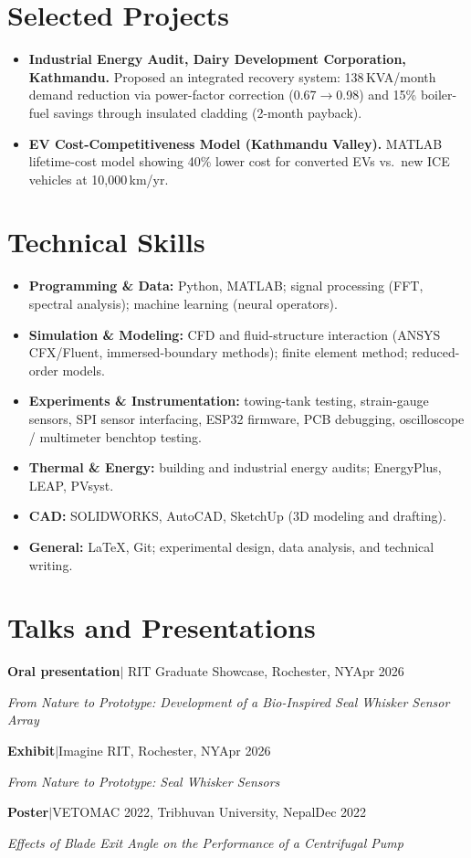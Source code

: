 \documentclass[10pt,letterpaper]{article}
\newcommand{\talk}[4]{\textbf{#1}\enspace$|$\enspace #2\hfill #3\par\nopagebreak\hspace*{1.2em}\textit{#4}\par\vspace{3pt}}
\begin{document}
\section*{Selected Projects}
\begin{itemize}
  \item \textbf{Industrial Energy Audit, Dairy Development Corporation, Kathmandu.} Proposed an integrated recovery system: 138\,KVA/month demand reduction via power-factor correction (0.67$\rightarrow$0.98) and 15\% boiler-fuel savings through insulated cladding (2-month payback).
  \item \textbf{EV Cost-Competitiveness Model (Kathmandu Valley).} MATLAB lifetime-cost model showing 40\% lower cost for converted EVs vs.\ new ICE vehicles at 10{,}000\,km/yr.
\end{itemize}

\section*{Technical Skills}
\begin{itemize}
  \item \textbf{Programming \& Data:} Python, MATLAB; signal processing (FFT, spectral analysis); machine learning (neural operators).
  \item \textbf{Simulation \& Modeling:} CFD and fluid-structure interaction (ANSYS CFX/Fluent, immersed-boundary methods); finite element method; reduced-order models.
  \item \textbf{Experiments \& Instrumentation:} towing-tank testing, strain-gauge sensors, SPI sensor interfacing, ESP32 firmware, PCB debugging, oscilloscope / multimeter benchtop testing.
  \item \textbf{Thermal \& Energy:} building and industrial energy audits; EnergyPlus, LEAP, PVsyst.
  \item \textbf{CAD:} SOLIDWORKS, AutoCAD, SketchUp (3D modeling and drafting).
  \item \textbf{General:} LaTeX, Git; experimental design, data analysis, and technical writing.
\end{itemize}

\section*{Talks and Presentations}
\talk{Oral presentation}{2026 RIT Graduate Showcase, Rochester, NY}{Apr 2026}{From Nature to Prototype: Development of a Bio-Inspired Seal Whisker Sensor Array}
\talk{Exhibit}{Imagine RIT, Rochester, NY}{Apr 2026}{From Nature to Prototype: Seal Whisker Sensors}
\talk{Poster}{VETOMAC 2022, Tribhuvan University, Nepal}{Dec 2022}{Effects of Blade Exit Angle on the Performance of a Centrifugal Pump}
\end{document}

